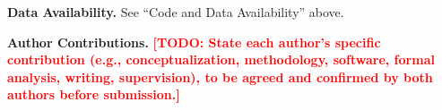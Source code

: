 \documentclass[conference]{IEEEtran}
\newcommand{\todo}[1]{\textcolor{red}{\textbf{[TODO: #1]}}}
\begin{document}
\textbf{Data Availability.} See ``Code and Data Availability'' above.

\textbf{Author Contributions.} \todo{State each author's specific
contribution (e.g., conceptualization, methodology, software, formal
analysis, writing, supervision), to be agreed and confirmed by both
authors before submission.}



\end{document}
